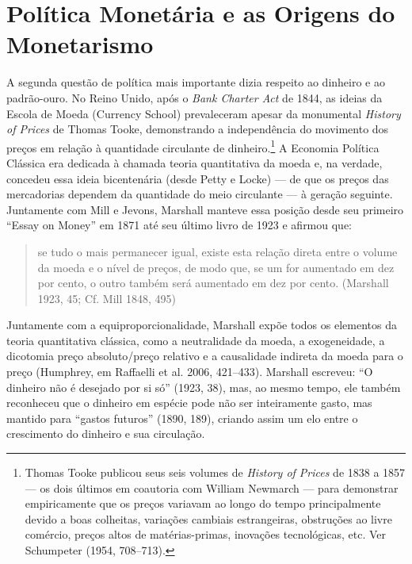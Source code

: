 \documentclass[12pt]{article}
\begin{document}
\section*{Política Monetária e as Origens do Monetarismo}

A segunda questão de política mais importante dizia respeito ao dinheiro e ao padrão-ouro. No Reino Unido, após o \textit{Bank Charter Act} de 1844, as ideias da Escola de Moeda (Currency School) prevaleceram apesar da monumental \textit{History of Prices} de Thomas Tooke, demonstrando a independência do movimento dos preços em relação à quantidade circulante de dinheiro.\footnote{Thomas Tooke publicou seus seis volumes de \textit{History of Prices} de 1838 a 1857 — os dois últimos em coautoria com William Newmarch — para demonstrar empiricamente que os preços variavam ao longo do tempo principalmente devido a boas colheitas, variações cambiais estrangeiras, obstruções ao livre comércio, preços altos de matérias-primas, inovações tecnológicas, etc. Ver Schumpeter (1954, 708–713).} A Economia Política Clássica era dedicada à chamada teoria quantitativa da moeda e, na verdade, concedeu essa ideia bicentenária (desde Petty e Locke) — de que os preços das mercadorias dependem da quantidade do meio circulante — à geração seguinte. Juntamente com Mill e Jevons, Marshall manteve essa posição desde seu primeiro “Essay on Money” em 1871 até seu último livro de 1923 e afirmou que:

\begin{quote}
se tudo o mais permanecer igual, existe esta relação direta entre o volume da moeda e o nível de preços, de modo que, se um for aumentado em dez por cento, o outro também será aumentado em dez por cento. (Marshall 1923, 45; Cf. Mill 1848, 495)
\end{quote}

Juntamente com a equiproporcionalidade, Marshall expõe todos os elementos da teoria quantitativa clássica, como a neutralidade da moeda, a exogeneidade, a dicotomia preço absoluto/preço relativo e a causalidade indireta da moeda para o preço (Humphrey, em Raffaelli et al. 2006, 421–433). Marshall escreveu: “O dinheiro não é desejado por si só” (1923, 38), mas, ao mesmo tempo, ele também reconheceu que o dinheiro em espécie pode não ser inteiramente gasto, mas mantido para “gastos futuros” (1890, 189), criando assim um elo entre o crescimento do dinheiro e sua circulação.
\end{document}
